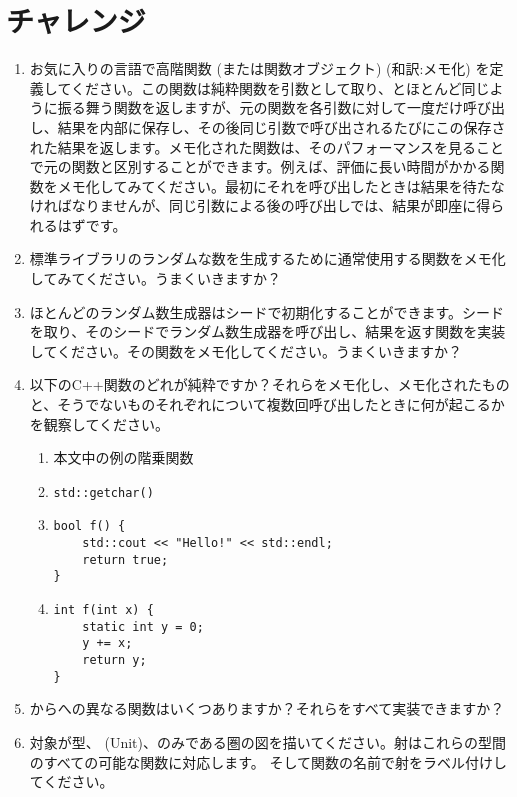 \section{チャレンジ}

\begin{enumerate}
  \tightlist
  \item
        お気に入りの言語で高階関数 (または関数オブジェクト)  (和訳:メモ化) を定義してください。この関数は純粋関数を引数として取り、とほとんど同じように振る舞う関数を返しますが、元の関数を各引数に対して一度だけ呼び出し、結果を内部に保存し、その後同じ引数で呼び出されるたびにこの保存された結果を返します。メモ化された関数は、そのパフォーマンスを見ることで元の関数と区別することができます。例えば、評価に長い時間がかかる関数をメモ化してみてください。最初にそれを呼び出したときは結果を待たなければなりませんが、同じ引数による後の呼び出しでは、結果が即座に得られるはずです。
  \item
        標準ライブラリのランダムな数を生成するために通常使用する関数をメモ化してみてください。うまくいきますか？
  \item
        ほとんどのランダム数生成器はシードで初期化することができます。シードを取り、そのシードでランダム数生成器を呼び出し、結果を返す関数を実装してください。その関数をメモ化してください。うまくいきますか？
  \item
        以下のC++関数のどれが純粋ですか？それらをメモ化し、メモ化されたものと、そうでないものそれぞれについて複数回呼び出したときに何が起こるかを観察してください。

        \begin{enumerate}
          \tightlist
          \item
                本文中の例の階乗関数
          \item
                \begin{verbatim}
std::getchar()
\end{verbatim}
          \item
                \begin{verbatim}
bool f() {
    std::cout << "Hello!" << std::endl;
    return true;
}
\end{verbatim}
          \item
                \begin{verbatim}
int f(int x) {
    static int y = 0;
    y += x;
    return y;
}
\end{verbatim}
        \end{enumerate}
  \item
        からへの異なる関数はいくつありますか？それらをすべて実装できますか？
  \item
        対象が型、\code{()} (Unit)、のみである圏の図を描いてください。射はこれらの型間のすべての可能な関数に対応します。
        そして関数の名前で射をラベル付けしてください。
\end{enumerate}
